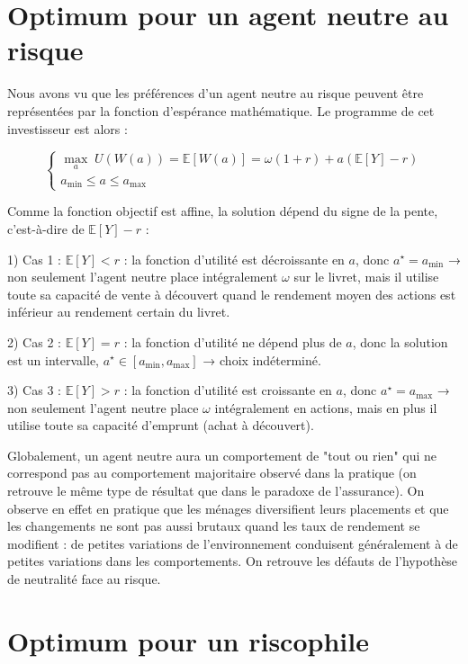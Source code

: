 \documentclass[a4paper, 12pt]{report}
\begin{document}
\section{Optimum pour un agent neutre au risque}

Nous avons vu que les préférences d'un agent neutre au risque peuvent être représentées par la fonction d’espérance mathématique. Le programme de cet investisseur est alors :

\[
\begin{cases}
	\underset{a}\max \; U(W(a)) = \mathbb{E}[W(a)] = \omega (1 + r) + a\left( \mathbb{E}[Y] - r\right)  \\
	a_{\text{min}} \leq a \leq a_{\text{max}}
\end{cases}
\]

Comme la fonction objectif est affine, la solution dépend du signe de la pente, c'est-à-dire de \( \mathbb{E}[Y] - r \) :

1) Cas 1 : \( \mathbb{E}[Y] < r \) : la fonction d'utilité est décroissante en \( a \), donc \( a^{\star} = a_{\text{min}} \) → non seulement l'agent neutre place intégralement \( \omega \) sur le livret, mais il utilise toute sa capacité de vente à découvert quand le rendement moyen des actions est inférieur au rendement certain du livret.

2) Cas 2 : \( \mathbb{E}[Y] = r \) : la fonction d'utilité ne dépend plus de \( a \), donc la solution est un intervalle, \( a^{\star} \in [a_{\text{min}}, a_{\text{max}}] \) → choix indéterminé.

3) Cas 3 : \( \mathbb{E}[Y] > r \) : la fonction d'utilité est croissante en \( a \), donc \( a^{\star} = a_{\text{max}} \) → non seulement l'agent neutre place \( \omega \) intégralement en actions, mais en plus il utilise toute sa capacité d'emprunt (achat à découvert).

Globalement, un agent neutre aura un comportement de "tout ou rien" qui ne correspond pas au comportement majoritaire observé dans la pratique (on retrouve le même type de résultat que dans le paradoxe de l'assurance). On observe en effet en pratique que les ménages diversifient leurs placements et que les changements ne sont pas aussi brutaux quand les taux de rendement se modifient : de petites variations de l'environnement conduisent généralement à de petites variations dans les comportements. On retrouve les défauts de l'hypothèse de neutralité face au risque.

\section{Optimum pour un riscophile}
\end{document}
